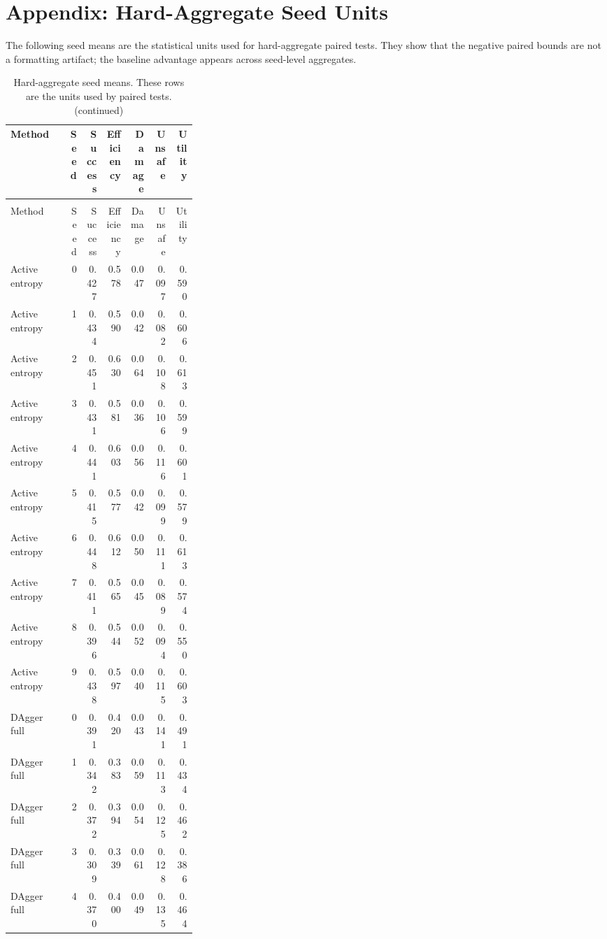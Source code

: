 \documentclass{article}
\begin{document}
\section{Appendix: Hard-Aggregate Seed Units}
The following seed means are the statistical units used for hard-aggregate paired tests. They show that the negative paired bounds are not a formatting artifact; the baseline advantage appears across seed-level aggregates.
\begin{center}
\tiny
\begin{longtable}{p{0.31\linewidth}rrrrrr}
\caption{Hard-aggregate seed means. These rows are the units used by paired tests.}\label{tab:hard-seed}\\
\toprule
Method & Seed & Success & Efficiency & Damage & Unsafe & Utility\\
\midrule
\endfirsthead
\caption[]{Hard-aggregate seed means. These rows are the units used by paired tests. (continued)}\\
\toprule
Method & Seed & Success & Efficiency & Damage & Unsafe & Utility\\
\midrule
\endhead
Active entropy & 0 & 0.427 & 0.578 & 0.047 & 0.097 & 0.590\\
Active entropy & 1 & 0.434 & 0.590 & 0.042 & 0.082 & 0.606\\
Active entropy & 2 & 0.451 & 0.630 & 0.064 & 0.108 & 0.613\\
Active entropy & 3 & 0.431 & 0.581 & 0.036 & 0.106 & 0.599\\
Active entropy & 4 & 0.441 & 0.603 & 0.056 & 0.116 & 0.601\\
Active entropy & 5 & 0.415 & 0.577 & 0.042 & 0.099 & 0.579\\
Active entropy & 6 & 0.448 & 0.612 & 0.050 & 0.111 & 0.613\\
Active entropy & 7 & 0.411 & 0.565 & 0.045 & 0.089 & 0.574\\
Active entropy & 8 & 0.396 & 0.544 & 0.052 & 0.094 & 0.550\\
Active entropy & 9 & 0.438 & 0.597 & 0.040 & 0.115 & 0.603\\
DAgger full & 0 & 0.391 & 0.420 & 0.043 & 0.141 & 0.491\\
DAgger full & 1 & 0.342 & 0.383 & 0.059 & 0.113 & 0.434\\
DAgger full & 2 & 0.372 & 0.394 & 0.054 & 0.125 & 0.462\\
DAgger full & 3 & 0.309 & 0.339 & 0.061 & 0.128 & 0.386\\
DAgger full & 4 & 0.370 & 0.400 & 0.049 & 0.135 & 0.464\\

\end{longtable}
\end{center}
\end{document}
